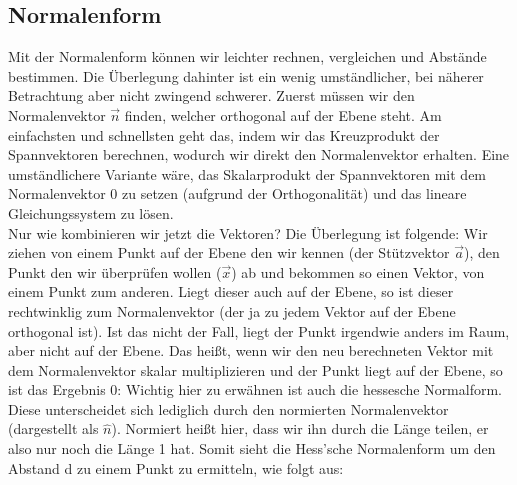 	\subsection{Normalenform}
		Mit der Normalenform können wir leichter rechnen, vergleichen und Abstände
		bestimmen. Die Überlegung dahinter ist ein wenig umständlicher, bei näherer
		Betrachtung aber nicht zwingend schwerer. Zuerst müssen wir den Normalenvektor
		\(\vec{n}\) finden, welcher orthogonal auf der Ebene steht. Am einfachsten und
		schnellsten geht das, indem wir das Kreuzprodukt der Spannvektoren berechnen,
		wodurch wir direkt den Normalenvektor erhalten. Eine umständlichere Variante
		wäre, das Skalarprodukt der Spannvektoren mit dem Normalenvektor 0 zu setzen
		(aufgrund der Orthogonalität) und das lineare Gleichungssystem zu lösen.\\
		Nur wie kombinieren wir jetzt die Vektoren? Die Überlegung ist folgende: Wir
		ziehen von einem Punkt auf der Ebene den wir kennen (der Stützvektor
		\(\vec{a}\)), den Punkt den wir überprüfen wollen (\(\vec{x}\)) ab und
		bekommen so einen Vektor, von einem Punkt zum anderen. Liegt dieser auch auf
		der Ebene, so ist dieser rechtwinklig zum Normalenvektor (der ja zu jedem
		Vektor auf der Ebene orthogonal ist). Ist das nicht der Fall, liegt der Punkt
		irgendwie anders im Raum, aber nicht auf der Ebene. Das heißt, wenn wir den
		neu berechneten Vektor mit dem Normalenvektor skalar multiplizieren und der
		Punkt liegt auf der Ebene, so ist das Ergebnis 0:
		\formel{\[E:\ (\vec{a}-\vec{x})\cdot\vec{n}=0\]}
		Wichtig hier zu erwähnen ist auch die hessesche Normalform. Diese
		unterscheidet sich lediglich durch den normierten Normalenvektor (dargestellt
		als \(\hat n\)). Normiert heißt hier, dass wir ihn durch die Länge teilen, er
		also nur noch die Länge 1 hat. Somit sieht die Hess'sche Normalenform um den
		Abstand d zu einem Punkt zu ermitteln, wie folgt aus:
		\formel{\[E:\ (\vec{a}-\vec{x})\cdot
		\frac{1}{|\vec{n}|}\vec{n}=(\vec{a}-\vec{x})\cdot \hat{n}=d\]}

